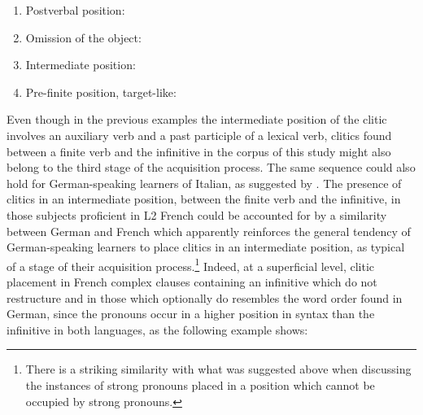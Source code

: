 \documentclass[output=paper,modfonts,nonflat,newtxmath]{langsci/langscibook}
\begin{document}
\begin{enumerate}
\item Postverbal position:
	  \label{ex:sciutti:41}
 		\z





\item Omission of the object:

			\z


\item Intermediate position:

		\z

\item Pre-finite position, target-like:
				\z

\end{enumerate}

Even though in the previous examples the intermediate position of the clitic involves an auxiliary verb and a past participle of a lexical verb, clitics found between a finite verb and the infinitive in the corpus of this study might also belong to the third stage of the acquisition process. The same sequence could also hold for German-speaking learners of Italian, as suggested by \citet{HamannBelletti2006}. The presence of clitics in an intermediate position, between the finite verb and the infinitive, in those subjects proficient in L2 French could be accounted for by a similarity between German and French which apparently reinforces the general tendency of German-speaking learners to place clitics in an intermediate position, as typical of a stage of their acquisition process.\footnote{ \textrm{There is a striking similarity with what was suggested above when discussing the instances of strong pronouns placed in a position which cannot be occupied by strong pronouns.}} Indeed, at a superficial level, clitic placement in French complex clauses containing an infinitive which do not restructure and in those which optionally do resembles the word order found in German, since the pronouns occur in a higher position in syntax than the infinitive in both languages, as the following example shows:
\end{document}
